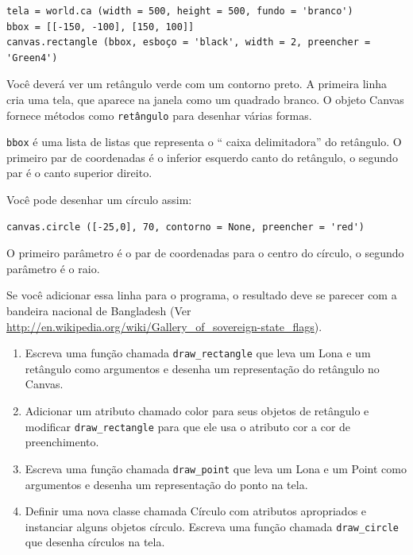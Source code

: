 \documentclass[10pt]{book}
\begin{document}
\begin{v erbatim}
{\begin{}
\begin{verbatim}
tela = world.ca (width = 500, height = 500, fundo = 'branco')
bbox = [[-150, -100], [150, 100]]
canvas.rectangle (bbox, esboço = 'black', width = 2, preencher = 'Green4')
\end{verbatim}

Você deverá ver um retângulo verde com um contorno preto.
A primeira linha cria uma tela, que aparece na janela
como um quadrado branco. O objeto Canvas fornece métodos como
{\tt retângulo} para desenhar várias formas.

{\tt bbox} é uma lista de listas que representa o `` caixa delimitadora''
do retângulo. O primeiro par de coordenadas é o inferior esquerdo
canto do retângulo, o segundo par é o canto superior direito.

Você pode desenhar um círculo assim:

\begin{verbatim}
canvas.circle ([-25,0], 70, contorno = None, preencher = 'red')
\end{verbatim}

O primeiro parâmetro é o par de coordenadas para o centro do
círculo, o segundo parâmetro é o raio.

Se você adicionar essa linha para o programa, 
o resultado deve se parecer com a bandeira nacional de Bangladesh
(Ver \url{http://en.wikipedia.org/wiki/Gallery_of_sovereign-state_flags}).

\begin{enumerate}

\item Escreva uma função chamada \verb "draw_rectangle" que leva um
  Lona e um retângulo como argumentos e desenha um
  representação do retângulo no Canvas.

\item Adicionar um atributo chamado {color \tt} para seus objetos de retângulo e
  modificar \verb "draw_rectangle" para que ele usa o atributo cor
  a cor de preenchimento.

\item Escreva uma função chamada \verb "draw_point" que leva um
  Lona e um Point como argumentos e desenha um
  representação do ponto na tela.

\item Definir uma nova classe chamada Círculo com atributos apropriados e
  instanciar alguns objetos círculo. Escreva uma função chamada
  \Verb "draw_circle" que desenha círculos na tela.


\end{enumerate}
\end{}}
\end{v erbatim}
\end{document}
